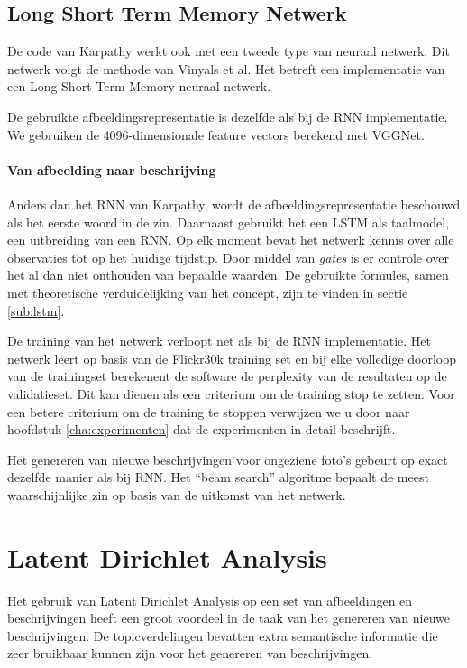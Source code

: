 \subsection{Long Short Term Memory Netwerk}
\label{sec:lstm}
De code van Karpathy werkt ook met een tweede type van neuraal netwerk. Dit netwerk volgt de methode van Vinyals et al.\cite{Google} Het betreft een implementatie van een Long Short Term Memory neuraal netwerk. 

De gebruikte afbeeldingsrepresentatie is dezelfde als bij de RNN implementatie. We gebruiken de 4096-dimensionale feature vectors berekend met VGGNet. 

\paragraph{Van afbeelding naar beschrijving}
Anders dan het RNN van Karpathy, wordt de afbeeldingsrepresentatie beschouwd als het eerste woord in de zin. Daarnaast gebruikt het een LSTM als taalmodel, een uitbreiding van een RNN. Op elk moment bevat het netwerk kennis over alle observaties tot op het huidige tijdstip. Door middel van \emph{gates} is er controle over het al dan niet onthouden van bepaalde waarden. De gebruikte formules, samen met theoretische verduidelijking van het concept, zijn te vinden in sectie \ref{sub:lstm}.

De training van het netwerk verloopt net als bij de RNN implementatie. Het netwerk leert op basis van de Flickr30k training set en bij elke volledige doorloop van de trainingset berekenent de software de perplexity van de resultaten op de validatieset. Dit kan dienen als een criterium om de training stop te zetten. Voor een betere criterium om de training te stoppen verwijzen we u door naar hoofdstuk \ref{cha:experimenten} dat de experimenten in detail beschrijft. %

Het genereren van nieuwe beschrijvingen voor ongeziene foto's gebeurt op exact dezelfde manier als bij RNN. Het ``beam search'' algoritme bepaalt de meest waarschijnlijke zin op basis van de uitkomst van het netwerk.



\section{Latent Dirichlet Analysis}
Het gebruik van Latent Dirichlet Analysis op een set van afbeeldingen en beschrijvingen heeft een groot voordeel in de taak van het genereren van nieuwe beschrijvingen. De topicverdelingen bevatten extra semantische informatie die zeer bruikbaar kunnen zijn voor het genereren van beschrijvingen.

